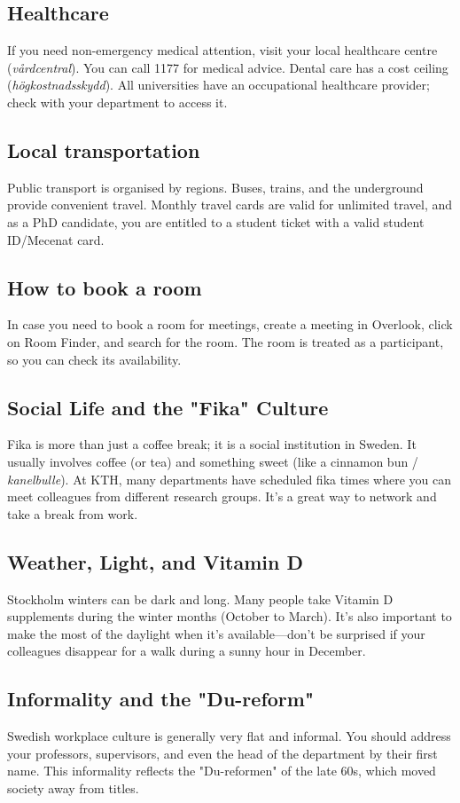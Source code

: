 \documentclass{article}
\begin{document}
\subsection{Healthcare}
If you need non-emergency medical attention, visit your local healthcare centre (\textit{vårdcentral}).
You can call 1177 for medical advice. Dental care has a cost ceiling (\textit{högkostnadsskydd}). All universities have an occupational healthcare provider; check with your department to access it.

\subsection{Local transportation}
Public transport is organised by regions. Buses, trains, and the underground provide convenient travel. Monthly travel cards are valid for unlimited travel, and as a PhD candidate, you are entitled to a student ticket with a valid student ID/Mecenat card.

\subsection{How to book a room}
In case you need to book a room for meetings, create a meeting in Overlook, click on Room Finder, and search for the room. The room is treated as a participant, so you can check its availability.

\subsection{Social Life and the "Fika" Culture}
Fika is more than just a coffee break; it is a social institution in Sweden. It usually involves coffee (or tea) and something sweet (like a cinnamon bun / \textit{kanelbulle}). At KTH, many departments have scheduled fika times where you can meet colleagues from different research groups. It's a great way to network and take a break from work.

\subsection{Weather, Light, and Vitamin D}
Stockholm winters can be dark and long. Many people take Vitamin D supplements during the winter months (October to March). It’s also important to make the most of the daylight when it’s available—don't be surprised if your colleagues disappear for a walk during a sunny hour in December.

\subsection{Informality and the "Du-reform"}
Swedish workplace culture is generally very flat and informal. You should address your professors, supervisors, and even the head of the department by their first name. This informality reflects the "Du-reformen" of the late 60s, which moved society away from titles.
\end{document}

